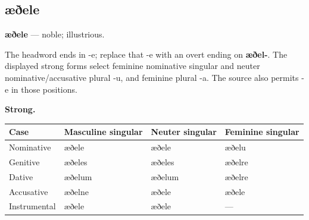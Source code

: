 \subsection*{æðele}

\par\begin{minipage}{\linewidth}\raggedright
\textbf{æðele} — noble; illustrious.

The headword ends in -e; replace that -e with an overt ending on \textbf{æðel-}. The displayed strong forms select feminine nominative singular and neuter nominative/\allowbreak{}accusative plural -u, and feminine plural -a. The source also permits -e in those positions.

\textbf{Strong.}

\par\begingroup
\fontsize{10.5}{13.2}\selectfont
\par\begin{minipage}{\linewidth}\raggedright
\setlength{\LTleft}{0pt}\setlength{\LTright}{\fill}
\noindent
\begin{tabular}{@{}>{\raggedright\arraybackslash}p{22mm}>{\raggedright\arraybackslash}p{31.18mm}>{\raggedright\arraybackslash}p{31.18mm}>{\raggedright\arraybackslash}p{31.18mm}@{}}
\toprule
\textbf{Case} & \textbf{Masculine singular} & \textbf{Neuter singular} & \textbf{Feminine singular} \\
\midrule
Nominative & æðele & æðele & æðelu \\
Genitive & æðeles & æðeles & æðelre \\
Dative & æðelum & æðelum & æðelre \\
Accusative & æðelne & æðele & æðele \\
Instrumental & æðele & æðele & — \\
\bottomrule
\end{tabular}
\end{minipage}\par
\par\endgroup
\end{minipage}\par
\par\addvspace{5pt}
